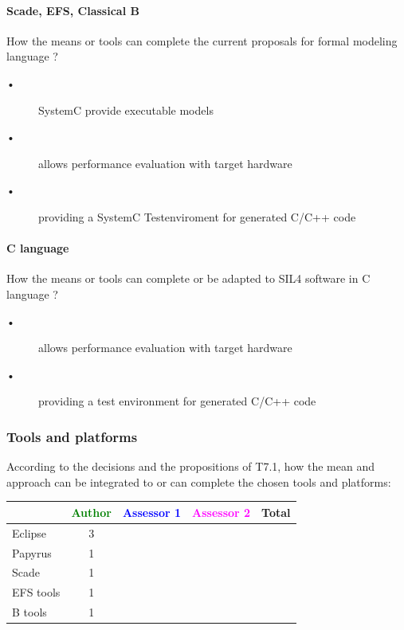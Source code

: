 \paragraph{Scade, EFS, Classical B}
How the means or tools can complete the current proposals for formal modeling language ?

\begin{author_comment}
\begin{description}
\item [•] SystemC provide executable models
\item [•] allows performance evaluation with target hardware
\item [•] providing a SystemC Testenviroment for generated C/C++ code
\end{description}
\end{author_comment}

\paragraph{C language}
How the means or tools can complete or be adapted to SIL4 software in C language ?

\begin{author_comment}
\begin{description}
\item [•] allows performance evaluation with target hardware
\item [•] providing a test environment for generated C/C++ code
\end{description}
\end{author_comment}

\subsubsection{Tools and platforms}

According to the decisions and the propositions of T7.1, how the mean and approach can be integrated to or can complete the chosen tools and platforms:

\begin{tabular}{|l | c | c | c | c|}
\hline
& \textcolor{green}{Author} & \textcolor{blue}{Assessor 1} & \textcolor{magenta}{Assessor 2} & Total \\
\hline 
Eclipse &3 & & &  \\
\hline
Papyrus  &1 & & & \\
\hline
Scade &1 & & & \\
\hline
EFS tools &1 & & & \\
\hline
B tools &1 & & & \\
\hline
\end{tabular}


